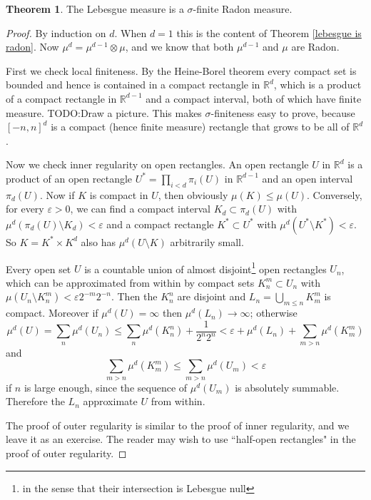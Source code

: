 \documentclass[12pt]{book}
\newcommand{\RR}{\mathbb{R}}
\theoremstyle{definition}
\newtheorem{theorem}{Theorem}[section]
\begin{document}
\begin{theorem}
\label{lebesgue is radon 2}
The Lebesgue measure is a $\sigma$-finite Radon measure.
\end{theorem}
\begin{proof}
By induction on $d$. When $d = 1$ this is the content of Theorem \ref{lebesgue is radon}.
Now $\mu^d = \mu^{d-1} \otimes \mu$, and we know that both $\mu^{d-1}$ and $\mu$ are Radon.

First we check local finiteness. By the Heine-Borel theorem every compact set is bounded and hence is contained in a compact rectangle in $\RR^d$, which is a product of a compact rectangle in $\RR^{d-1}$ and a compact interval, both of which have finite measure.
TODO:Draw a picture.
This makes $\sigma$-finiteness easy to prove, because $[-n, n]^d$ is a compact (hence finite measure) rectangle that grows to be all of $\RR^d$.

Now we check inner regularity on open rectangles.
An open rectangle $U$ in $\RR^d$ is a product of an open rectangle $U^* = \prod_{i<d} \pi_i(U)$ in $\RR^{d-1}$ and an open interval $\pi_d(U)$.
Now if $K$ is compact in $U$, then obviously $\mu(K) \leq \mu(U)$.
Conversely, for every $\varepsilon > 0$, we can find a compact interval $K_d \subset \pi_d(U)$ with $\mu^d(\pi_d(U) \setminus K_d) < \varepsilon$ and a compact rectangle $K^* \subset U^*$ with $\mu^d(U^* \setminus K^*) < \varepsilon$. So $K = K^* \times K^d$ also has $\mu^d(U \setminus K)$ arbitrarily small.

Every open set $U$ is a countable union of almost disjoint\footnote{in the sense that their intersection is Lebesgue null} open rectangles $U_n$, which can be approximated from within by compact sets $K_n^m \subset U_n$ with $\mu(U_n \setminus K_n^m) < \varepsilon 2^{-m}2^{-n}$. Then the $K_n^n$ are disjoint and $L_n = \bigcup_{m \leq n} K_m^m$ is compact.
Moreover if $\mu^d(U) = \infty$ then $\mu^d(L_n) \to \infty$; otherwise
$$\mu^d(U) = \sum_n \mu^d(U_n) \leq \sum_n \mu^d(K_n^n) + \frac{1}{2^n2^n} < \varepsilon + \mu^d(L_n) + \sum_{m > n} \mu^d(K_m^m)$$
and
$$\sum_{m > n} \mu^d(K_m^m) \leq \sum_{m > n} \mu^d(U_m) < \varepsilon$$
if $n$ is large enough, since the sequence of $\mu^d(U_m)$ is absolutely summable.
Therefore the $L_n$ approximate $U$ from within.

The proof of outer regularity is similar to the proof of inner regularity, and we leave it as an exercise.
The reader may wish to use ``half-open rectangles" in the proof of outer regularity.
\end{proof}
\end{document}
